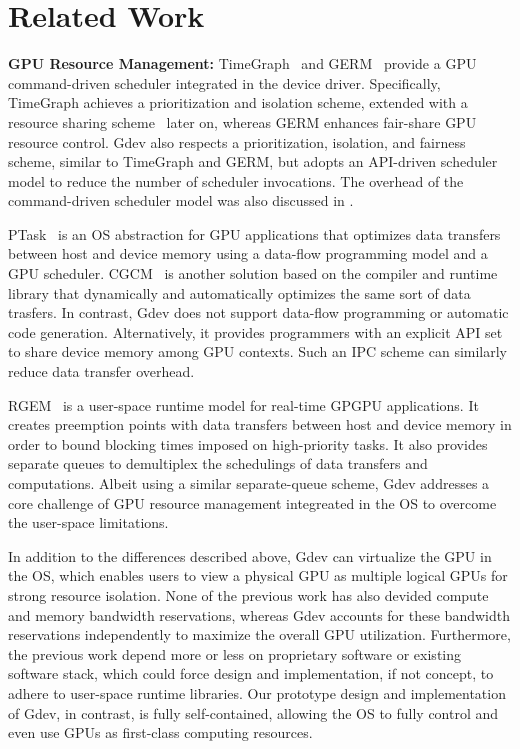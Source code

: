 \vspace{-0.25em}
\section{Related Work}
\label{sec:related_work}
\vspace{-0.25em}

\textbf{GPU Resource Management:}
TimeGraph~\cite{Kato_ATC11} and GERM~\cite{Bautin_MCNC08} provide a GPU
command-driven scheduler integrated in the device driver.
Specifically, TimeGraph achieves a prioritization and isolation scheme,
extended with a resource sharing scheme~\cite{Kato_RTAS11} later on,
whereas GERM enhances fair-share GPU resource control.
Gdev also respects a prioritization, isolation, and fairness scheme,
similar to TimeGraph and GERM, but adopts an API-driven scheduler model
to reduce the number of scheduler invocations.
The overhead of the command-driven scheduler model was
also discussed in \cite{Kato_ATC11}.


PTask~\cite{Rossbach_SOSP11} is an OS abstraction for GPU applications
that optimizes data transfers between host and device memory using
a data-flow programming model and a GPU scheduler.
CGCM~\cite{Jablin_PLDI11} is another solution based on the compiler and
runtime library that dynamically and automatically optimizes the same
sort of data trasfers.
In contrast, Gdev does not support data-flow programming or automatic
code generation.
Alternatively, it provides programmers with an explicit API set to share
device memory among GPU contexts.
Such an IPC scheme can similarly reduce data transfer overhead.

RGEM~\cite{Kato_RTSS11} is a user-space runtime model for real-time
GPGPU applications.
It creates preemption points with data transfers between host and device
memory in order to bound blocking times imposed on high-priority tasks.
It also provides separate queues to demultiplex the schedulings of data
transfers and computations.
Albeit using a similar separate-queue scheme, Gdev addresses a core
challenge of GPU resource management integreated in the OS to overcome
the user-space limitations.

In addition to the differences described above, Gdev can virtualize the
GPU in the OS, which enables users to view a physical GPU as multiple
logical GPUs for strong resource isolation.
None of the previous work has also devided compute and memory
bandwidth reservations, whereas Gdev accounts for these bandwidth
reservations independently to maximize the overall GPU utilization.
Furthermore, the previous work depend more or less on proprietary
software or existing software stack, which could force design and
implementation, if not concept, to adhere to user-space runtime
libraries.
Our prototype design and implementation of Gdev, in contrast, is fully
self-contained, allowing the OS to fully control and even use GPUs as
first-class computing resources.

